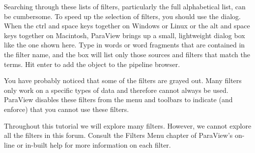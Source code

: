Searching through these lists of filters, particularly the full
alphabetical list, can be cumbersome.  To speed up the selection of
filters, you should use the  dialog.  When the ctrl
and space keys together on Windows or Linux or the alt and space keys
together on Macintosh, ParaView brings up a small, lightweight dialog box
like the one shown here.  Type in words or word fragments that are
contained in the filter name, and the box will list only those sources and
filters that match the terms.  Hit enter to add the object to the pipeline
browser.

You have probably noticed that some of the filters are grayed out.  Many
filters only work on a specific types of data and therefore cannot always
be used.  ParaView disables these filters from the menu and toolbars to
indicate (and enforce) that you cannot use these filters.

Throughout this tutorial we will explore many filters.  However, we cannot
explore all the filters in this forum.  Consult the Filters Menu
chapter of ParaView's on-line or in-built help for more information on each filter.

